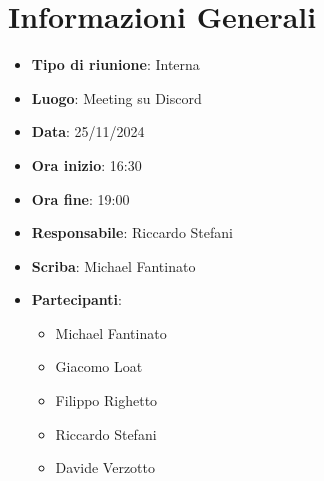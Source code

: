 

\section{Informazioni Generali}

\begin{itemize}
    \item \textbf{Tipo di riunione}: Interna
    \item \textbf{Luogo}: Meeting su Discord
    \item \textbf{Data}: 25/11/2024
    \item \textbf{Ora inizio}: 16:30
    \item \textbf{Ora fine}: 19:00
    \item \textbf{Responsabile}: Riccardo Stefani
    \item \textbf{Scriba}: Michael Fantinato
    \item \textbf{Partecipanti}:
    \begin{itemize}
        \item Michael Fantinato
        \item Giacomo Loat
        \item Filippo Righetto
        \item Riccardo Stefani
        \item Davide Verzotto
    \end{itemize}
\end{itemize}
